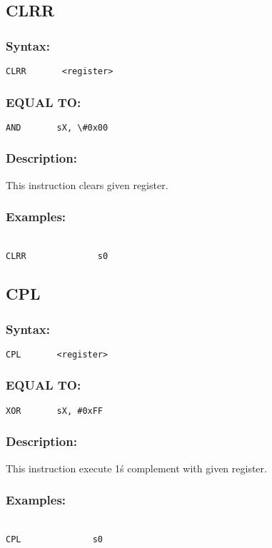{    \subsection{CLRR}
        \subsubsection{Syntax:}
            \verb'CLRR       <register>'

        \subsubsection{EQUAL TO:}
            \verb'AND       sX, \#0x00'

        \subsubsection{Description:}
            This instruction clears given register.

        \subsubsection{Examples:}
        {
            ~\\
            \usecodefont
            \verb'CLRR              s0'\\
        }

    \subsection{CPL}
        \subsubsection{Syntax:}
            \verb'CPL       <register>'

        \subsubsection{EQUAL TO:}
            \verb'XOR       sX, #0xFF'

        \subsubsection{Description:}
            This instruction execute 1\'s complement with given register.

        \subsubsection{Examples:}
        {
            ~\\
            \usecodefont
            \verb'CPL              s0'\\
        }

}

